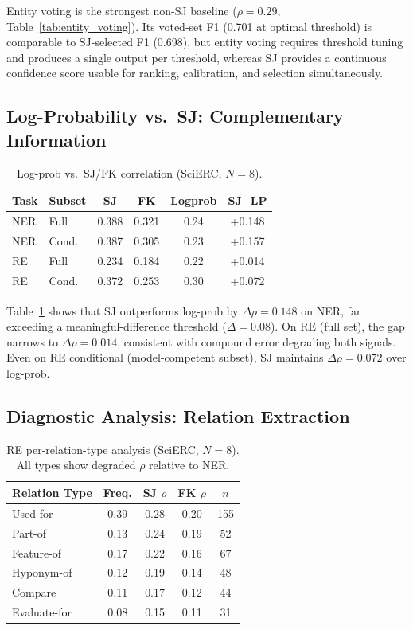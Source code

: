 \documentclass[11pt,a4paper]{article}
\begin{document}
Entity voting is the strongest non-SJ baseline ($\rho{=}0.29$, Table~\ref{tab:entity_voting}). Its voted-set F1 (0.701 at optimal threshold) is comparable to SJ-selected F1 (0.698), but entity voting requires threshold tuning and produces a single output per threshold, whereas SJ provides a continuous confidence score usable for ranking, calibration, and selection simultaneously.

\subsection{Log-Probability vs.\ SJ: Complementary Information}
\label{sec:logprob}

\begin{table}[t]
\centering
\small
\caption{Log-prob vs.\ SJ/FK correlation (SciERC, $N{=}8$).}
\label{tab:logprob}
\begin{tabular}{llcccc}
\toprule
\textbf{Task} & \textbf{Subset} & \textbf{SJ} & \textbf{FK} & \textbf{Logprob} & \textbf{SJ$-$LP} \\
\midrule
NER & Full & 0.388 & 0.321 & 0.24 & +0.148 \\
NER & Cond. & 0.387 & 0.305 & 0.23 & +0.157 \\
RE  & Full & 0.234 & 0.184 & 0.22 & +0.014 \\
RE  & Cond. & 0.372 & 0.253 & 0.30 & +0.072 \\
\bottomrule
\end{tabular}
\end{table}

Table~\ref{tab:logprob} shows that SJ outperforms log-prob by $\Delta\rho{=}0.148$ on NER, far exceeding a meaningful-difference threshold ($\Delta{=}0.08$). On RE (full set), the gap narrows to $\Delta\rho{=}0.014$, consistent with compound error degrading both signals. Even on RE conditional (model-competent subset), SJ maintains $\Delta\rho{=}0.072$ over log-prob.

\subsection{Diagnostic Analysis: Relation Extraction}
\label{sec:re_diagnostic}

\begin{table}[t]
\centering
\small
\caption{RE per-relation-type analysis (SciERC, $N{=}8$). All types show degraded $\rho$ relative to NER.}
\label{tab:re_pertype}
\begin{tabular}{lcccc}
\toprule
\textbf{Relation Type} & \textbf{Freq.} & \textbf{SJ $\rho$} & \textbf{FK $\rho$} & $n$ \\
\midrule
Used-for & 0.39 & 0.28 & 0.20 & 155 \\
Part-of & 0.13 & 0.24 & 0.19 & 52 \\
Feature-of & 0.17 & 0.22 & 0.16 & 67 \\
Hyponym-of & 0.12 & 0.19 & 0.14 & 48 \\
Compare & 0.11 & 0.17 & 0.12 & 44 \\
Evaluate-for & 0.08 & 0.15 & 0.11 & 31 \\
\bottomrule
\end{tabular}
\end{table}
\end{document}
